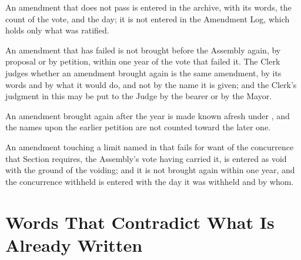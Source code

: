 \begin{clauses}
\item An amendment that does not pass is entered in the archive, with its words, the count of the vote, and the day; it is not entered in the Amendment Log, which holds only what was ratified.
\item An amendment that has failed is not brought before the Assembly again, by proposal or by petition, within one year of the vote that failed it. The Clerk judges whether an amendment brought again is the same amendment, by its words and by what it would do, and not by the name it is given; and the Clerk's judgment in this may be put to the Judge by the bearer or by the Mayor.
\item An amendment brought again after the year is made known afresh under , and the names upon the earlier petition are not counted toward the later one.
\item An amendment touching a limit named in  that fails for want of the concurrence that Section requires, the Assembly's vote having carried it, is entered as void with the ground of the voiding; and it is not brought again within one year, and the concurrence withheld is entered with the day it was withheld and by whom.
\end{clauses}

\section{Words That Contradict What Is Already Written}
\label{sec:amendment:words-that-contradict-what-is-already-written}

